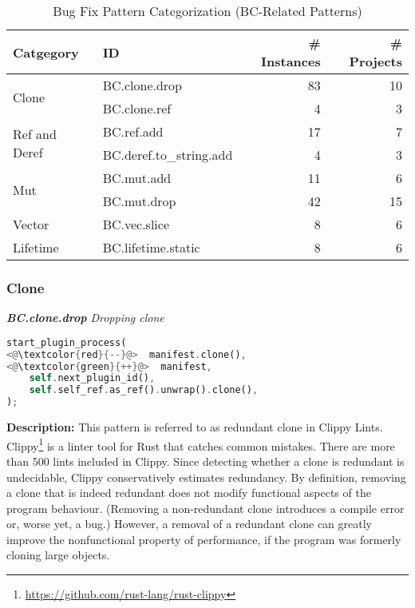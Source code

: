 \begin{table}[]
\begin{tabular}{l|l|r|r}
\textbf{Catgegory} & \textbf{ID} & \textbf{\# Instances} & \textbf{\# Projects} \\
\hline
\multirow{2}{*}{Clone}                                         & BC.clone.drop & 83 & 10 \\
& BC.clone.ref & 4 & 3   
\\\cline{1-4}
\multirow{2}{*}{Ref and Deref} & BC.ref.add & 17 & 7 \\
& BC.deref.to\_string.add  & 4 & 3                                            \\\cline{1-4}
\multirow{2}{*}{Mut} & BC.mut.add  & 11 & 6 \\
& BC.mut.drop  & 42 & 15                               \\\cline{1-4}
Vector & BC.vec.slice  & 8 & 6                                    \\\cline{1-4}
\multirow{1}{*}{Lifetime}      
& BC.lifetime.static  & 8 & 6
\\
\end{tabular}
\caption{\label{table:bc}Bug Fix Pattern Categorization (BC-Related Patterns)}
\end{table}
    

\subsubsection{Clone}

\noindent\textit{\textbf{BC.clone.drop} Dropping clone}

\begin{lstlisting}[language=Rust, style=colouredRust]
start_plugin_process(
<@\textcolor{red}{--}@>  manifest.clone(),
<@\textcolor{green}{++}@>  manifest,
    self.next_plugin_id(),
    self.self_ref.as_ref().unwrap().clone(),
);
\end{lstlisting}

\noindent\textbf{Description:} This pattern is referred to as redundant clone in Clippy Lints. Clippy\footnote{\url{https://github.com/rust-lang/rust-clippy}} is a linter tool for Rust that catches common mistakes. There are more than 500 lints included in Clippy. Since detecting whether a clone is redundant is undecidable, Clippy conservatively estimates redundancy. By definition, removing a clone that is indeed redundant does not modify functional aspects of the program behaviour. (Removing a non-redundant clone introduces a compile error or, worse yet, a bug.) However, a removal of a redundant clone can greatly improve the nonfunctional property of performance, if the program was formerly cloning large objects. \\


